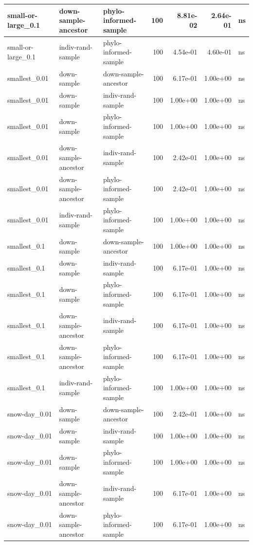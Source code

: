 \documentclass[
]{book}
\begin{document}
\begin{table}
\begin{tabular}[t]{l|l|l|r|r|r|l}
\hline
small-or-large\_0.1 & down-sample-ancestor & phylo-informed-sample & 100 & 8.81e-02 & 2.64e-01 & ns\\
\hline
small-or-large\_0.1 & indiv-rand-sample & phylo-informed-sample & 100 & 4.54e-01 & 4.60e-01 & ns\\
\hline
smallest\_0.01 & down-sample & down-sample-ancestor & 100 & 6.17e-01 & 1.00e+00 & ns\\
\hline
smallest\_0.01 & down-sample & indiv-rand-sample & 100 & 1.00e+00 & 1.00e+00 & ns\\
\hline
smallest\_0.01 & down-sample & phylo-informed-sample & 100 & 1.00e+00 & 1.00e+00 & ns\\
\hline
smallest\_0.01 & down-sample-ancestor & indiv-rand-sample & 100 & 2.42e-01 & 1.00e+00 & ns\\
\hline
smallest\_0.01 & down-sample-ancestor & phylo-informed-sample & 100 & 2.42e-01 & 1.00e+00 & ns\\
\hline
smallest\_0.01 & indiv-rand-sample & phylo-informed-sample & 100 & 1.00e+00 & 1.00e+00 & ns\\
\hline
smallest\_0.1 & down-sample & down-sample-ancestor & 100 & 1.00e+00 & 1.00e+00 & ns\\
\hline
smallest\_0.1 & down-sample & indiv-rand-sample & 100 & 6.17e-01 & 1.00e+00 & ns\\
\hline
smallest\_0.1 & down-sample & phylo-informed-sample & 100 & 6.17e-01 & 1.00e+00 & ns\\
\hline
smallest\_0.1 & down-sample-ancestor & indiv-rand-sample & 100 & 6.17e-01 & 1.00e+00 & ns\\
\hline
smallest\_0.1 & down-sample-ancestor & phylo-informed-sample & 100 & 6.17e-01 & 1.00e+00 & ns\\
\hline
smallest\_0.1 & indiv-rand-sample & phylo-informed-sample & 100 & 1.00e+00 & 1.00e+00 & ns\\
\hline
snow-day\_0.01 & down-sample & down-sample-ancestor & 100 & 2.42e-01 & 1.00e+00 & ns\\
\hline
snow-day\_0.01 & down-sample & indiv-rand-sample & 100 & 1.00e+00 & 1.00e+00 & ns\\
\hline
snow-day\_0.01 & down-sample & phylo-informed-sample & 100 & 1.00e+00 & 1.00e+00 & ns\\
\hline
snow-day\_0.01 & down-sample-ancestor & indiv-rand-sample & 100 & 6.17e-01 & 1.00e+00 & ns\\
\hline
snow-day\_0.01 & down-sample-ancestor & phylo-informed-sample & 100 & 6.17e-01 & 1.00e+00 & ns\\

\end{tabular}
\end{table}
\end{document}
